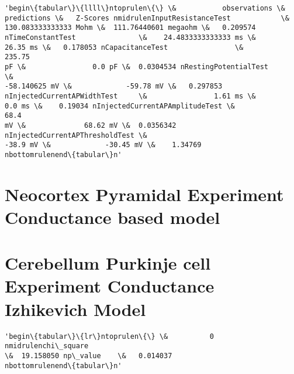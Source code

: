             \begin{tcolorbox}[breakable, size=fbox, boxrule=.5pt, pad at break*=1mm, opacityfill=0]
\begin{Verbatim}[commandchars=\\\{\}]
'begin\{tabular\}\{llll\}ntoprulen\{\} \&           observations \&
predictions \&   Z-Scores nmidrulenInputResistanceTest            \&
130.083333333333 Mohm \&  111.76440601 megaohm \&   0.209574
nTimeConstantTest               \&    24.4833333333333 ms \&
26.35 ms \&   0.178053 nCapacitanceTest                \&              235.75
pF \&                0.0 pF \&  0.0304534 nRestingPotentialTest           \&
-58.140625 mV \&             -59.78 mV \&   0.297853
nInjectedCurrentAPWidthTest     \&                1.61 ms \&
0.0 ms \&    0.19034 nInjectedCurrentAPAmplitudeTest \&                68.4
mV \&              68.62 mV \&  0.0356342 nInjectedCurrentAPThresholdTest \&
-38.9 mV \&             -30.45 mV \&    1.34769
nbottomrulenend\{tabular\}n'
\end{Verbatim}
\end{tcolorbox}
        
    \hypertarget{neocortex-pyramidal-experiment-conductance-based-model}{%
\section{Neocortex Pyramidal Experiment Conductance based
model}\label{neocortex-pyramidal-experiment-conductance-based-model}}

    \hypertarget{cerebellum-purkinje-cell-experiment-conductance-izhikevich-model}{%
\section{Cerebellum Purkinje cell Experiment Conductance Izhikevich
Model}\label{cerebellum-purkinje-cell-experiment-conductance-izhikevich-model}}


            \begin{tcolorbox}[breakable, size=fbox, boxrule=.5pt, pad at break*=1mm, opacityfill=0]
\begin{Verbatim}[commandchars=\\\{\}]
'begin\{tabular\}\{lr\}ntoprulen\{\} \&          0 nmidrulenchi\_square
\&  19.158050 np\_value    \&   0.014037
nbottomrulenend\{tabular\}n'
\end{Verbatim}
\end{tcolorbox}
        
